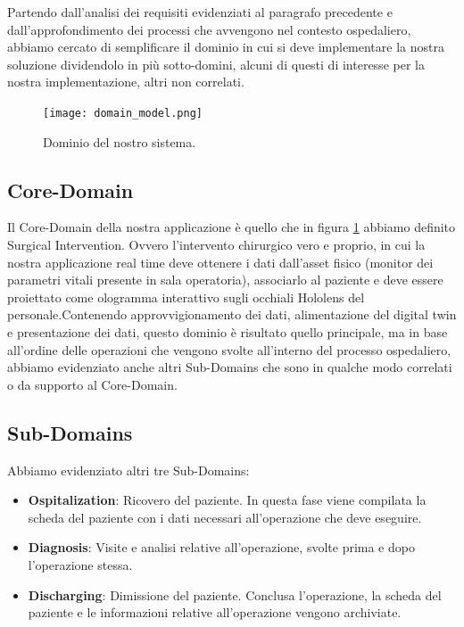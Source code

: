 Partendo dall'analisi dei requisiti evidenziati al paragrafo precedente e dall'approfondimento dei processi che avvengono nel contesto ospedaliero, abbiamo cercato di semplificare il dominio in cui si deve implementare la nostra soluzione dividendolo in più sotto-domini, alcuni di questi di interesse per la nostra implementazione, altri non correlati.

\begin{figure}[H]
    \texttt{[image: domain\_model.png]}
    \centering
    \caption{\label{pic:domain-model}Dominio del nostro sistema.}
\end{figure}

\subsection{Core-Domain}
Il Core-Domain della nostra applicazione è quello che in figura \ref{pic:domain-model} abbiamo definito Surgical Intervention. Ovvero l'intervento chirurgico vero e proprio, in cui la nostra applicazione real time deve ottenere i dati dall'asset fisico (monitor dei parametri vitali presente in sala operatoria), associarlo al paziente e deve essere proiettato come ologramma interattivo sugli occhiali Hololens del personale.\newline \newline Contenendo approvvigionamento dei dati, alimentazione del digital twin e presentazione dei dati, questo dominio è risultato quello principale, ma in base all'ordine delle operazioni che vengono svolte all'interno del processo ospedaliero, abbiamo evidenziato anche altri Sub-Domains che sono in qualche modo correlati o da supporto al Core-Domain.

\subsection{Sub-Domains}
Abbiamo evidenziato altri tre Sub-Domains:
\begin{itemize}
    \item \textbf{Ospitalization}: Ricovero del paziente. In questa fase viene compilata la scheda del paziente con i dati necessari all'operazione che deve eseguire.
    
    \item \textbf{Diagnosis}: Visite e analisi relative all'operazione, svolte prima e dopo l'operazione stessa.
    
    \item \textbf{Discharging}: Dimissione del paziente. Conclusa l'operazione, la scheda del paziente e le informazioni relative all'operazione vengono archiviate.
\end{itemize}

